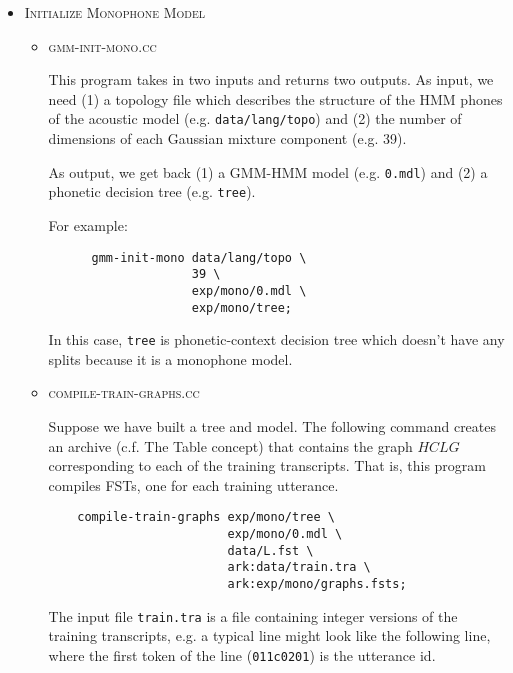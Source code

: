 \documentclass[10pt,a4paper]{article}
\begin{document}
\begin{itemize}

\item \textsc{Initialize Monophone Model}
  \begin{itemize}
    \vspace{.25cm}
  \item \textsc{gmm-init-mono.cc}

   This program takes in two inputs and returns two outputs. As input, we need (1) a topology file which describes the structure of the HMM phones of the acoustic model (e.g. \texttt{data/lang/topo}) and (2) the number of dimensions of each Gaussian mixture component (e.g. 39).

As output, we get back (1) a GMM-HMM model (e.g. \texttt{0.mdl}) and (2) a phonetic decision tree (e.g. \texttt{tree}). 

    For example:\\

    \begin{verbatim}
      gmm-init-mono data/lang/topo \
                    39 \
                    exp/mono/0.mdl \
                    exp/mono/tree;
    \end{verbatim}

    In this case, \texttt{tree} is phonetic-context decision tree which doesn't have any splits because it is a monophone model.

    \vspace{.25cm}
  \item \textsc{compile-train-graphs.cc}

    Suppose we have built a tree and model. The following command creates an archive (c.f. The Table concept) that contains the graph $HCLG$ corresponding to each of the training transcripts. That is, this program compiles FSTs, one for each training utterance.\\
    
    \begin{verbatim}
    compile-train-graphs exp/mono/tree \
                         exp/mono/0.mdl \
                         data/L.fst \ 
                         ark:data/train.tra \
                         ark:exp/mono/graphs.fsts;
    \end{verbatim}
 
    The input file \texttt{train.tra} is a file containing integer versions of the training transcripts, e.g. a typical line might look like the following line, where the first token of the line (\texttt{011c0201}) is the utterance id. \\


\end{itemize}
\end{itemize}
\end{document}
